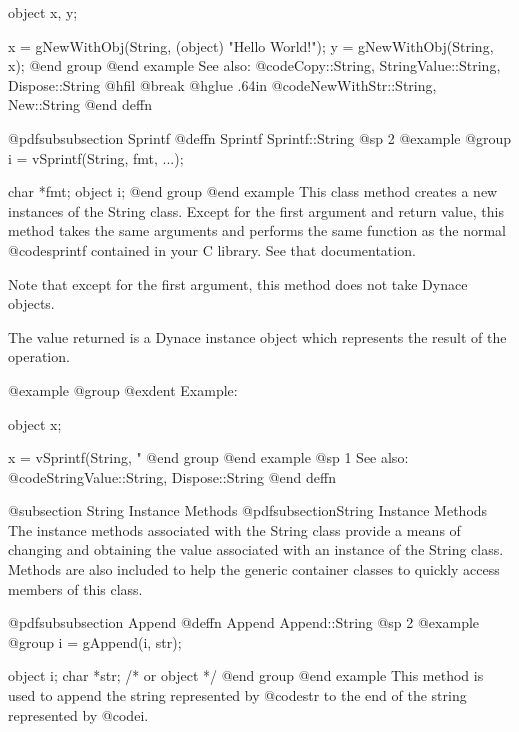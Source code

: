 object  x, y;

x = gNewWithObj(String, (object) "Hello World!");
y = gNewWithObj(String, x);
@end group
@end example
See also:  @code{Copy::String, StringValue::String, Dispose::String}
@hfil @break @hglue .64in      @code{NewWithStr::String, New::String}
@end deffn












@pdfsubsubsection {Sprintf}
@deffn {Sprintf} Sprintf::String
@sp 2
@example
@group
i = vSprintf(String, fmt, ...);

char    *fmt;
object  i;
@end group
@end example
This class method creates a new instances of the String class.  Except
for the first argument and return value, this method takes the same
arguments and performs the same function as the normal @code{sprintf}
contained in your C library.  See that documentation.

Note that except for the first argument, this method does not take
Dynace objects.

The value returned is a Dynace instance object which represents the result
of the operation.

@example
@group
@exdent Example:

object  x;

x = vSprintf(String, "%
@end group
@end example
@sp 1
See also:  @code{StringValue::String, Dispose::String}
@end deffn





@subsection String Instance Methods
@pdfsubsection{String Instance Methods}
The instance methods associated with the String class provide a
means of changing and obtaining the value associated with an instance of
the String class.  Methods are also included to help the generic
container classes to quickly access members of this class.








@pdfsubsubsection {Append}
@deffn {Append} Append::String
@sp 2
@example
@group
i = gAppend(i, str);

object  i;
char    *str;  /*  or object  */
@end group
@end example
This method is used to append the string represented by @code{str}
to the end of the string represented by @code{i}.


